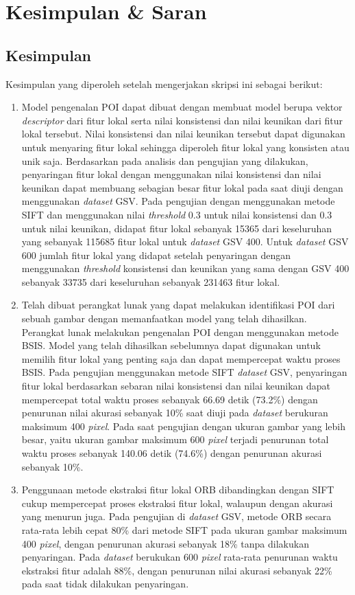 \chapter{Kesimpulan \& Saran}
\label{chap:kesimpulan_saran}

\section{Kesimpulan}
Kesimpulan yang diperoleh setelah mengerjakan skripsi ini sebagai berikut:
\begin{enumerate}
	\item Model pengenalan POI dapat dibuat dengan membuat model berupa vektor \textit{descriptor} dari fitur lokal serta nilai konsistensi dan nilai keunikan dari fitur lokal tersebut. Nilai konsistensi dan nilai keunikan tersebut dapat digunakan untuk menyaring fitur lokal sehingga diperoleh fitur lokal yang konsisten atau unik saja. Berdasarkan pada analisis dan pengujian yang dilakukan, penyaringan fitur lokal dengan menggunakan nilai konsistensi dan nilai keunikan dapat membuang sebagian besar fitur lokal pada saat diuji dengan menggunakan \textit{dataset} GSV. Pada pengujian dengan menggunakan metode SIFT dan menggunakan nilai \textit{threshold} 0.3 untuk nilai konsistensi dan 0.3 untuk nilai keunikan, didapat fitur lokal sebanyak 15365 dari keseluruhan yang sebanyak 115685 fitur lokal untuk \textit{dataset} GSV 400. Untuk \textit{dataset} GSV 600 jumlah fitur lokal yang didapat setelah penyaringan dengan menggunakan \textit{threshold} konsistensi dan keunikan yang sama dengan GSV 400 sebanyak 33735 dari keseluruhan sebanyak 231463 fitur lokal.
	\item Telah dibuat perangkat lunak yang dapat melakukan identifikasi POI dari sebuah gambar dengan memanfaatkan model yang telah dihasilkan. Perangkat lunak melakukan pengenalan POI dengan menggunakan metode BSIS. Model yang telah dihasilkan sebelumnya dapat digunakan untuk memilih fitur lokal yang penting saja dan dapat mempercepat waktu proses BSIS. Pada pengujian menggunakan metode SIFT \textit{dataset} GSV, penyaringan fitur lokal berdasarkan sebaran nilai konsistensi dan nilai keunikan dapat mempercepat total waktu proses sebanyak 66.69 detik (73.2\%) dengan penurunan nilai akurasi sebanyak 10\% saat diuji pada \textit{dataset} berukuran maksimum 400 \textit{pixel}. Pada saat pengujian dengan ukuran gambar yang lebih besar, yaitu ukuran gambar maksimum 600 \textit{pixel} terjadi penurunan total waktu proses sebanyak 140.06 detik (74.6\%) dengan penurunan akurasi sebanyak 10\%.
	\item Penggunaan metode ekstraksi fitur lokal ORB dibandingkan dengan SIFT cukup mempercepat proses ekstraksi fitur lokal, walaupun dengan akurasi yang menurun juga. Pada pengujian di \textit{dataset} GSV, metode ORB secara rata-rata lebih cepat 80\% dari metode SIFT pada ukuran gambar maksimum 400 \textit{pixel}, dengan penurunan akurasi sebanyak 18\% tanpa dilakukan penyaringan. Pada \textit{dataset} berukukan 600 \textit{pixel} rata-rata penurunan waktu ekstraksi fitur adalah 88\%, dengan penurunan nilai akurasi sebanyak 22\% pada saat tidak dilakukan penyaringan.
\end{enumerate}

